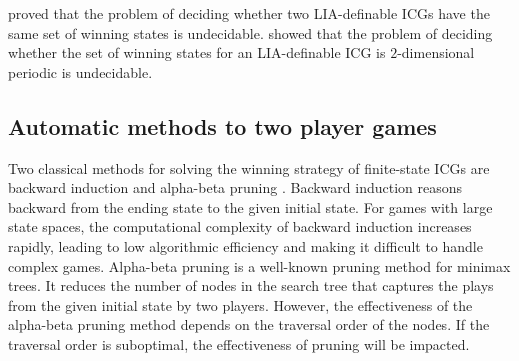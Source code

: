 \documentclass[review]{elsarticle}
\begin{document}
\citet{LarW2013} proved that the problem of deciding whether two LIA-definable ICGs have the same set of winning states is undecidable.	
\citet{Lar2013} showed that the problem of deciding whether the set of winning states for an LIA-definable ICG is $2$-dimensional periodic is undecidable.	


\subsection{Automatic methods to two player games}
Two classical methods for solving the winning strategy of finite-state ICGs are backward induction \cite{Wat2002} and alpha-beta pruning \cite{BelM2020,HeiPS2008}.
Backward induction reasons backward from the ending state to the given initial state. For games with large state spaces, the computational complexity of backward induction increases rapidly, leading to low algorithmic efficiency and making it difficult to handle complex games. 
Alpha-beta pruning is a well-known pruning method for minimax trees. It reduces the number of nodes in the search tree that captures the plays from the given initial state by two players. However, the effectiveness of the alpha-beta pruning method depends on the traversal order of the nodes. If the traversal order is suboptimal, the effectiveness of pruning will be impacted. 
\end{document}
